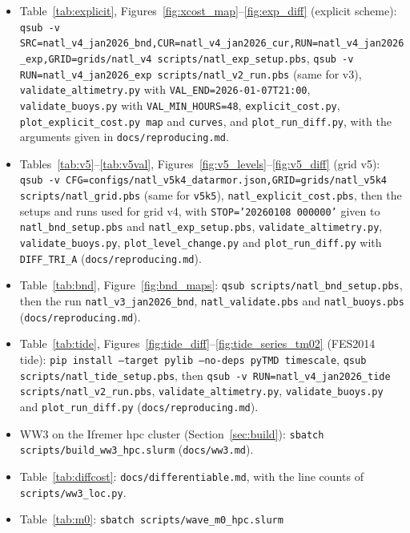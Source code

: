 \documentclass[11pt,a4paper]{article}
\begin{document}
\begin{itemize}
  \texttt{natl\_validate.pbs}, \texttt{natl\_buoys.pbs} and
  \texttt{python scripts/plot\_run\_diff.py} (\texttt{docs/reproducing.md}).
\item Table~\ref{tab:explicit}, Figures~\ref{fig:xcost_map}--\ref{fig:exp_diff}
  (explicit scheme):
  \texttt{qsub -v SRC=natl\_v4\_jan2026\_bnd,CUR=natl\_v4\_jan2026\_cur,RUN=natl\_v4\_jan2026\_exp,GRID=grids/natl\_v4 scripts/natl\_exp\_setup.pbs},
  \texttt{qsub -v RUN=natl\_v4\_jan2026\_exp scripts/natl\_v2\_run.pbs} (same for v3),
  \texttt{validate\_altimetry.py} with \texttt{VAL\_END=2026-01-07T21:00},
  \texttt{validate\_buoys.py} with \texttt{VAL\_MIN\_HOURS=48},
  \texttt{explicit\_cost.py}, \texttt{plot\_explicit\_cost.py map} and
  \texttt{curves}, and \texttt{plot\_run\_diff.py}, with the arguments
  given in \texttt{docs/reproducing.md}.
\item Tables~\ref{tab:v5}--\ref{tab:v5val}, Figures~\ref{fig:v5_levels}--\ref{fig:v5_diff}
  (grid v5): \texttt{qsub -v CFG=configs/natl\_v5k4\_datarmor.json,GRID=grids/natl\_v5k4 scripts/natl\_grid.pbs}
  (same for \texttt{v5k5}), \texttt{natl\_explicit\_cost.pbs}, then the
  setups and runs used for grid v4, with \texttt{STOP='20260108 000000'}
  given to \texttt{natl\_bnd\_setup.pbs} and \texttt{natl\_exp\_setup.pbs},
  \texttt{validate\_altimetry.py}, \texttt{validate\_buoys.py},
  \texttt{plot\_level\_change.py} and \texttt{plot\_run\_diff.py} with
  \texttt{DIFF\_TRI\_A} (\texttt{docs/reproducing.md}).
\item Table~\ref{tab:bnd}, Figure~\ref{fig:bnd_maps}:
  \texttt{qsub scripts/natl\_bnd\_setup.pbs}, then the run
  \texttt{natl\_v3\_jan2026\_bnd}, \texttt{natl\_validate.pbs} and
  \texttt{natl\_buoys.pbs} (\texttt{docs/reproducing.md}).
\item Table~\ref{tab:tide}, Figures~\ref{fig:tide_diff}--\ref{fig:tide_series_tm02}
  (FES2014 tide): \texttt{pip install --target pylib --no-deps pyTMD timescale},
  \texttt{qsub scripts/natl\_tide\_setup.pbs}, then
  \texttt{qsub -v RUN=natl\_v4\_jan2026\_tide scripts/natl\_v2\_run.pbs},
  \texttt{validate\_altimetry.py}, \texttt{validate\_buoys.py} and
  \texttt{plot\_run\_diff.py} (\texttt{docs/reproducing.md}).
\item WW3 on the Ifremer hpc cluster (Section~\ref{sec:build}):
  \texttt{sbatch scripts/build\_ww3\_hpc.slurm} (\texttt{docs/ww3.md}).
\item Table~\ref{tab:diffcost}: \texttt{docs/differentiable.md}, with the
  line counts of \texttt{scripts/ww3\_loc.py}.
\item Table~\ref{tab:m0}: \texttt{sbatch scripts/wave\_m0\_hpc.slurm}

\end{itemize}
\end{document}
